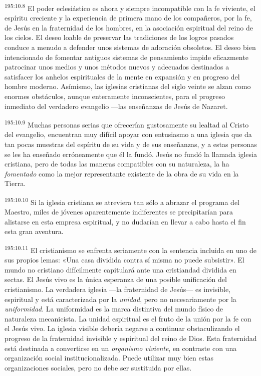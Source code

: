 \par 
\textsuperscript{195:10.8} El poder eclesiástico es ahora y siempre incompatible con la fe viviente, el espíritu creciente y la experiencia de primera mano de los compañeros, por la fe, de Jesús en la fraternidad de los hombres, en la asociación espiritual del reino de los cielos. El deseo loable de preservar las tradiciones de los logros pasados conduce a menudo a defender unos sistemas de adoración obsoletos. El deseo bien intencionado de fomentar antiguos sistemas de pensamiento impide eficazmente patrocinar unos medios y unos métodos nuevos y adecuados destinados a satisfacer los anhelos espirituales de la mente en expansión y en progreso del hombre moderno. Asímismo, las iglesias cristianas del siglo veinte se alzan como enormes obstáculos, aunque enteramente inconscientes, para el progreso inmediato del verdadero evangelio ---las enseñanzas de Jesús de Nazaret.

\par 
\textsuperscript{195:10.9} Muchas personas serias que ofrecerían gustosamente su lealtad al Cristo del evangelio, encuentran muy difícil apoyar con entusiasmo a una iglesia que da tan pocas muestras del espíritu de su vida y de sus enseñanzas, y a estas personas se les ha enseñado erróneamente que él la fundó. Jesús no fundó la llamada iglesia cristiana, pero de todas las maneras compatibles con su naturaleza, la ha \textit{fomentado} como la mejor representante existente de la obra de su vida en la Tierra.

\par 
\textsuperscript{195:10.10} Si la iglesia cristiana se atreviera tan sólo a abrazar el programa del Maestro, miles de jóvenes aparentemente indiferentes se precipitarían para alistarse en esta empresa espiritual, y no dudarían en llevar a cabo hasta el fin esta gran aventura.

\par 
\textsuperscript{195:10.11} El cristianismo se enfrenta seriamente con la sentencia incluida en uno de sus propios lemas: «Una casa dividida contra sí misma no puede subsistir». El mundo no cristiano difícilmente capitulará ante una cristiandad dividida en sectas. El Jesús vivo es la única esperanza de una posible unificación del cristianismo. La verdadera iglesia ---la fraternidad de Jesús--- es invisible, espiritual y está caracterizada por la \textit{unidad}, pero no necesariamente por la \textit{uniformidad}. La uniformidad es la marca distintiva del mundo físico de naturaleza mecanicista. La unidad espiritual es el fruto de la unión por la fe con el Jesús vivo. La iglesia visible debería negarse a continuar obstaculizando el progreso de la fraternidad invisible y espiritual del reino de Dios. Esta fraternidad está destinada a convertirse en un \textit{organismo viviente}, en contraste con una organización social institucionalizada. Puede utilizar muy bien estas organizaciones sociales, pero no debe ser sustituida por ellas.

